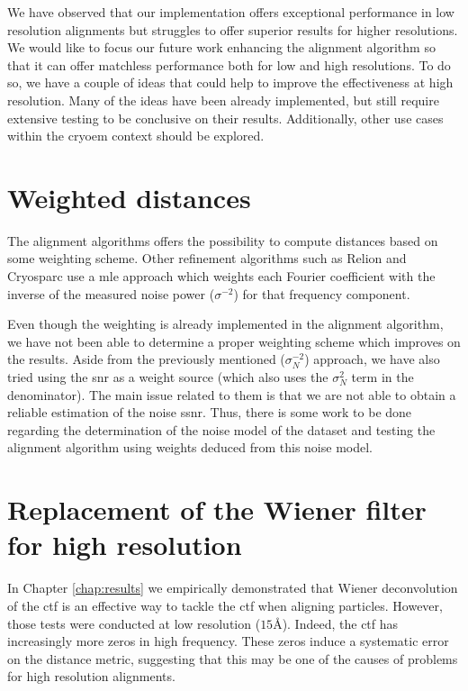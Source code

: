 \documentclass[../main.tex]{subfiles}
\begin{document}
We have observed that our implementation offers exceptional performance in low resolution alignments but struggles to offer superior results for higher resolutions. We would like to focus our future work enhancing the alignment algorithm so that it can offer matchless performance both for low and high resolutions. To do so, we have a couple of ideas that could help to improve the effectiveness at high resolution. Many of the ideas have been already implemented, but still require extensive testing to be conclusive on their results. Additionally, other use cases within the \gls{cryoem} context should be explored.

\section{Weighted distances}
The alignment algorithms offers the possibility to compute distances based on some weighting scheme. Other refinement algorithms such as Relion and Cryosparc use a \gls{mle} approach which weights each Fourier coefficient with the inverse of the measured noise power ($\sigma^{-2}$) for that frequency component.

Even though the weighting is already implemented in the alignment algorithm, we have not been able to determine a proper weighting scheme which improves on the results. Aside from the previously mentioned ($\sigma_N^{-2}$) approach, we have also tried using the \gls{snr} as a weight source (which also uses the $\sigma_N^{2}$ term in the denominator). The main issue related to them is that we are not able to obtain a reliable estimation of the noise \gls{ssnr}. Thus, there is some work to be done regarding the determination of the noise model of the dataset and testing the alignment algorithm using weights deduced from this noise model.

\section{Replacement of the Wiener filter for high resolution}
In Chapter \ref{chap:results} we empirically demonstrated that Wiener deconvolution of the \gls{ctf} is an effective way to tackle the \gls{ctf} when aligning particles. However, those tests were conducted at low resolution ($15 \si{\angstrom}$). Indeed, the \gls{ctf} has increasingly more zeros in high frequency. These zeros induce a systematic error on the distance metric, suggesting that this may be one of the causes of problems for high resolution alignments.
\end{document}
